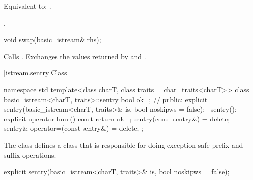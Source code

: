 \begin{itemdescr}
\pnum
\effects
Equivalent to: .

\pnum
\returns
{}.
\end{itemdescr}

%
\begin{itemdecl}
void swap(basic_istream& rhs);
\end{itemdecl}

\begin{itemdescr}
\pnum
\effects
Calls .
Exchanges the values returned by  and
.
\end{itemdescr}

[istream.sentry]{Class }

%
%
\begin{codeblock}
namespace std {
  template<class charT, class traits = char_traits<charT>>
  class basic_istream<charT, traits>::sentry {
    bool ok_;                   // \expos
  public:
    explicit sentry(basic_istream<charT, traits>& is, bool noskipws = false);
    ~sentry();
    explicit operator bool() const { return ok_; }
    sentry(const sentry&) = delete;
    sentry& operator=(const sentry&) = delete;
  };
}
\end{codeblock}

\begin{itemdescr}
\pnum
The class
defines a class that is responsible for doing exception safe prefix and suffix
operations.
\end{itemdescr}

%
%
\begin{itemdecl}
explicit sentry(basic_istream<charT, traits>& is, bool noskipws = false);
\end{itemdecl}

